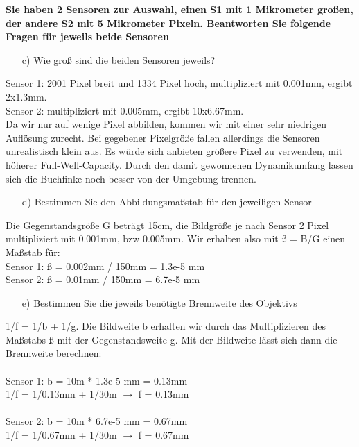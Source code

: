 \documentclass[a4paper]{article}
\begin{document}
	\textbf{Sie haben 2 Sensoren zur Auswahl, einen S1 mit 1 Mikrometer großen, der andere S2 mit 5 Mikrometer Pixeln. Beantworten Sie folgende Fragen für jeweils beide Sensoren}\\
	
	\begin{itemize}
		\item[c)] Wie groß sind die beiden Sensoren jeweils?
	\end{itemize}

	Sensor 1: 2001 Pixel breit und 1334 Pixel hoch, multipliziert mit 0.001mm, ergibt 2x1.3mm.\\
	Sensor 2: multipliziert mit 0.005mm, ergibt 10x6.67mm.\\
	
	Da wir nur auf wenige Pixel abbilden, kommen wir mit einer sehr niedrigen Auflösung zurecht. Bei gegebener Pixelgröße fallen allerdings die Sensoren unrealistisch klein aus. Es würde sich anbieten größere Pixel zu verwenden, mit höherer Full-Well-Capacity. Durch den damit gewonnenen Dynamikumfang lassen sich die Buchfinke noch besser von der Umgebung trennen.
	
	\begin{itemize}
		\item[d)] Bestimmen Sie den Abbildungsmaßstab für den jeweiligen Sensor
	\end{itemize}

	Die Gegenstandsgröße G beträgt 15cm, die Bildgröße je nach Sensor 2 Pixel multipliziert mit 0.001mm, bzw 0.005mm. Wir erhalten also mit ß = B/G einen Maßstab für:\\
	Sensor 1: ß = 0.002mm / 150mm = 1.3e-5 mm\\
	Sensor 2: ß = 0.01mm / 150mm = 6.7e-5 mm\\

	\begin{itemize}
	\item[e)] Bestimmen Sie die jeweils benötigte Brennweite des Objektivs
	\end{itemize}

	1/f = 1/b + 1/g. Die Bildweite b erhalten wir durch das Multiplizieren des Maßstabs ß mit der Gegenstandsweite g. Mit der Bildweite lässt sich dann die Brennweite berechnen:\\
	\\
	Sensor 1: b = 10m * 1.3e-5 mm = 0.13mm\\
	1/f = 1/0.13mm + 1/30m $\rightarrow$ f = 0.13mm\\
	\\
	Sensor 2: b = 10m * 6.7e-5 mm = 0.67mm\\
	1/f = 1/0.67mm + 1/30m $\rightarrow$ f = 0.67mm\\
\end{document}
